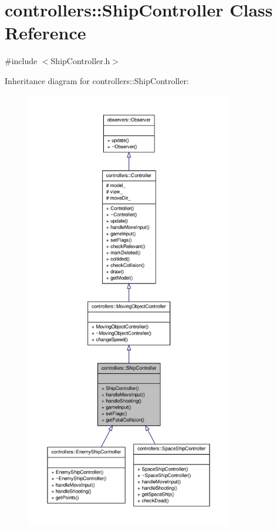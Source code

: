 \hypertarget{classcontrollers_1_1ShipController}{\section{controllers\-:\-:\-Ship\-Controller \-Class \-Reference}
\label{d8/dcc/classcontrollers_1_1ShipController}
}


{\ttfamily \#include $<$\-Ship\-Controller.\-h$>$}



\-Inheritance diagram for controllers\-:\-:\-Ship\-Controller\-:\nopagebreak
\begin{figure}[H]
\begin{center}
\leavevmode
\includegraphics[height=550pt]{d7/d01/classcontrollers_1_1ShipController__inherit__graph}
\end{center}
\end{figure}


